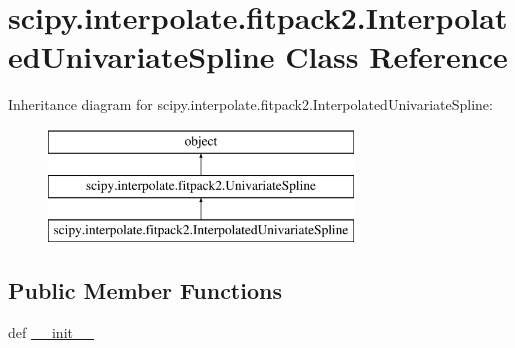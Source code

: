 \hypertarget{classscipy_1_1interpolate_1_1fitpack2_1_1InterpolatedUnivariateSpline}{}\section{scipy.\+interpolate.\+fitpack2.\+Interpolated\+Univariate\+Spline Class Reference}
\label{classscipy_1_1interpolate_1_1fitpack2_1_1InterpolatedUnivariateSpline}
Inheritance diagram for scipy.\+interpolate.\+fitpack2.\+Interpolated\+Univariate\+Spline\+:\begin{figure}[H]
\begin{center}
\leavevmode
\includegraphics[height=3.000000cm]{classscipy_1_1interpolate_1_1fitpack2_1_1InterpolatedUnivariateSpline}
\end{center}
\end{figure}
\subsection*{Public Member Functions}
\begin{DoxyCompactItemize}
\item 
def \hyperlink{classscipy_1_1interpolate_1_1fitpack2_1_1InterpolatedUnivariateSpline_ac9db10bc78deb78578a9fba3459a5aec}{\+\_\+\+\_\+init\+\_\+\+\_\+}
\end{DoxyCompactItemize}


